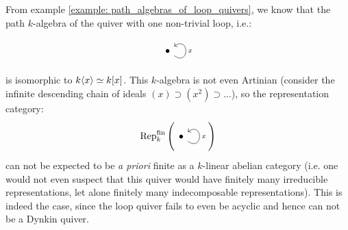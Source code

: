             \begin{example}
                
            \end{example}
            \begin{example}
                
            \end{example}
            \begin{example}
                From example \ref{example: path_algebras_of_loop_quivers}, we know that the path $k$-algebra of the quiver with one non-trivial loop, i.e.:
                    $$
                        \begin{tikzcd}
                            \bullet \arrow["x"', loop, distance=2em, in=35, out=325]
                        \end{tikzcd}
                    $$
                is isomorphic to $k\langle x\rangle \simeq k[x]$. This $k$-algebra is not even Artinian (consider the infinite descending chain of ideals $(x) \supset (x^2) \supset ...$), so the representation category:
                    $$\Rep_k^{\fin}\left(\begin{tikzcd}\bullet \arrow["x"', loop, distance=2em, in=35, out=325]\end{tikzcd}\right)$$
                can not be expected to be \textit{a priori} finite as a $k$-linear abelian category (i.e. one would not even suspect that this quiver would have finitely many irreducible representations, let alone finitely many indecomposable representations). This is indeed the case, since the loop quiver fails to even be acyclic and hence can not be a Dynkin quiver.
            \end{example}
            \begin{example}
                
            \end{example}
        
